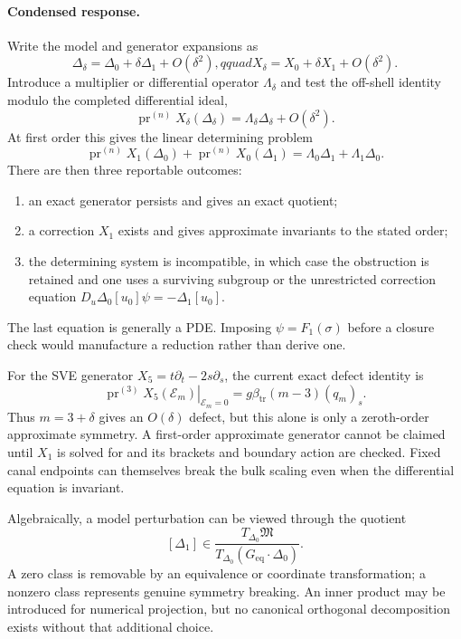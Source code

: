 \documentclass[11pt]{article}
\newcommand{\pr}{\operatorname{pr}}
\begin{document}
\paragraph{Condensed response.}
Write the model and generator expansions as
\[
 \Delta_\delta=\Delta_0+\delta\Delta_1+O(\delta^2),qquad
 X_\delta=X_0+\delta X_1+O(\delta^2).
\]
Introduce a multiplier or differential operator $\Lambda_\delta$ and test the
off-shell identity modulo the completed differential ideal,
\[
 \pr^{(n)}X_\delta(\Delta_\delta)
   =\Lambda_\delta\Delta_\delta+O(\delta^2).
\]
At first order this gives the linear determining problem
\[
 \pr^{(n)}X_1(\Delta_0)+\pr^{(n)}X_0(\Delta_1)
 =\Lambda_0\Delta_1+\Lambda_1\Delta_0.
\]
There are then three reportable outcomes:
\begin{enumerate}[label=(\roman*)]
\item an exact generator persists and gives an exact quotient;
\item a correction $X_1$ exists and gives approximate invariants to the stated
      order;
\item the determining system is incompatible, in which case the obstruction is
      retained and one uses a surviving subgroup or the unrestricted correction
      equation
      $D_u\Delta_0[u_0]\psi=-\Delta_1[u_0]$.
\end{enumerate}
The last equation is generally a PDE.  Imposing $\psi=F_1(\sigma)$ before a
closure check would manufacture a reduction rather than derive one.

For the SVE generator $X_5=t\partial_t-2s\partial_s$, the current exact defect
identity is
\[
 \left.\pr^{(3)}X_5(\mathcal E_m)\right|_{\mathcal E_m=0}
   =g\beta_{\mathrm{tr}}(m-3)(q_m)_s.
\]
Thus $m=3+\delta$ gives an $O(\delta)$ defect, but this alone is only a
zeroth-order approximate symmetry.  A first-order approximate generator cannot
be claimed until $X_1$ is solved for and its brackets and boundary action are
checked.  Fixed canal endpoints can themselves break the bulk scaling even when
the differential equation is invariant.

Algebraically, a model perturbation can be viewed through the quotient
\[
 [\Delta_1]\in
 \frac{T_{\Delta_0}\mathfrak M}
 {T_{\Delta_0}(G_{\mathrm{eq}}\!\cdot\!\Delta_0)}.
\]
A zero class is removable by an equivalence or coordinate transformation; a
nonzero class represents genuine symmetry breaking.  An inner product may be
introduced for numerical projection, but no canonical orthogonal decomposition
exists without that additional choice.
\end{document}
